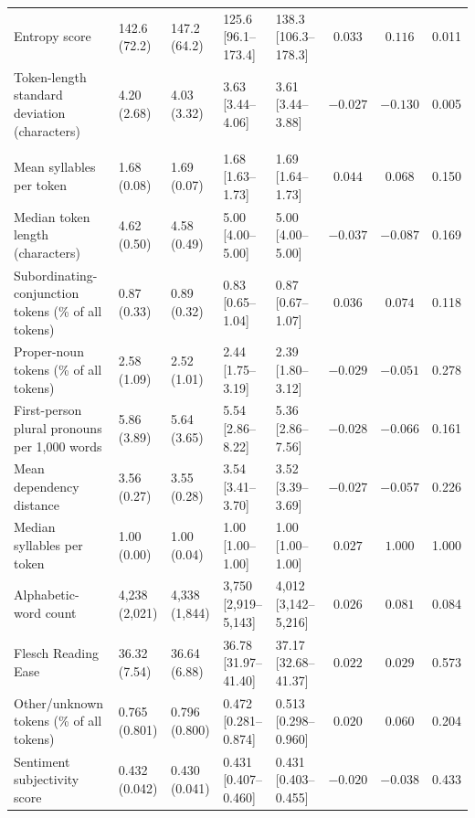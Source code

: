 \begin{landscape}
\begin{longtable}{@{}p{5.2cm}p{2.65cm}p{2.65cm}p{2.85cm}p{2.85cm}ccc@{}}
Entropy score & 142.6 (72.2) & 147.2 (64.2) & 125.6 [96.1--173.4] & 138.3 [106.3--178.3] & $0.033$ & $0.116$ & 0.011 \\
Token-length standard deviation (characters) & 4.20 (2.68) & 4.03 (3.32) & 3.63 [3.44--4.06] & 3.61 [3.44--3.88] & $-0.027$ & $-0.130$ & 0.005 \\
\addlinespace[4pt]
\midrule
\rowcolor{gray!18}
\multicolumn{8}{@{}l}{\textbf{Not statistically significant after BH correction ($q \geq .05$; 21 features)}} \\
\addlinespace[2pt]
\rowcolor{gray!7}
Mean syllables per token & 1.68 (0.08) & 1.69 (0.07) & 1.68 [1.63--1.73] & 1.69 [1.64--1.73] & $0.044$ & $0.068$ & 0.150 \\
\rowcolor{gray!7}
Median token length (characters) & 4.62 (0.50) & 4.58 (0.49) & 5.00 [4.00--5.00] & 5.00 [4.00--5.00] & $-0.037$ & $-0.087$ & 0.169 \\
\rowcolor{gray!7}
Subordinating-conjunction tokens (\% of all tokens) & 0.87 (0.33) & 0.89 (0.32) & 0.83 [0.65--1.04] & 0.87 [0.67--1.07] & $0.036$ & $0.074$ & 0.118 \\
\rowcolor{gray!7}
Proper-noun tokens (\% of all tokens) & 2.58 (1.09) & 2.52 (1.01) & 2.44 [1.75--3.19] & 2.39 [1.80--3.12] & $-0.029$ & $-0.051$ & 0.278 \\
\rowcolor{gray!7}
First-person plural pronouns per 1,000 words & 5.86 (3.89) & 5.64 (3.65) & 5.54 [2.86--8.22] & 5.36 [2.86--7.56] & $-0.028$ & $-0.066$ & 0.161 \\
\rowcolor{gray!7}
Mean dependency distance & 3.56 (0.27) & 3.55 (0.28) & 3.54 [3.41--3.70] & 3.52 [3.39--3.69] & $-0.027$ & $-0.057$ & 0.226 \\
\rowcolor{gray!7}
Median syllables per token & 1.00 (0.00) & 1.00 (0.04) & 1.00 [1.00--1.00] & 1.00 [1.00--1.00] & $0.027$ & $1.000$ & 1.000 \\
\rowcolor{gray!7}
Alphabetic-word count & 4,238 (2,021) & 4,338 (1,844) & 3,750 [2,919--5,143] & 4,012 [3,142--5,216] & $0.026$ & $0.081$ & 0.084 \\
\rowcolor{gray!7}
Flesch Reading Ease & 36.32 (7.54) & 36.64 (6.88) & 36.78 [31.97--41.40] & 37.17 [32.68--41.37] & $0.022$ & $0.029$ & 0.573 \\
\rowcolor{gray!7}
Other/unknown tokens (\% of all tokens) & 0.765 (0.801) & 0.796 (0.800) & 0.472 [0.281--0.874] & 0.513 [0.298--0.960] & $0.020$ & $0.060$ & 0.204 \\
\rowcolor{gray!7}
Sentiment subjectivity score & 0.432 (0.042) & 0.430 (0.041) & 0.431 [0.407--0.460] & 0.431 [0.403--0.455] & $-0.020$ & $-0.038$ & 0.433 \\

\end{longtable}
\end{landscape}
